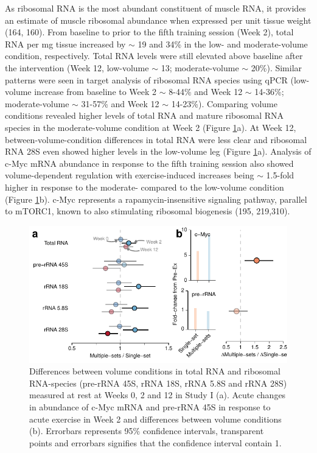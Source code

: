 \documentclass[twoside,10pt]{gihclass} %
\begin{document}
As ribosomal RNA is the most abundant constituent of muscle RNA, it provides an estimate of muscle ribosomal abundance when expressed per unit tissue weight
(164, 160).
From baseline to prior to the fifth training session (Week 2), total RNA per mg tissue increased by \(\sim\) 19 and 34\% in the low- and moderate-volume condition, respectively. Total RNA levels were still elevated above baseline after the intervention (Week 12, low-volume \(\sim\) 13; moderate-volume \(\sim\) 20\%). Similar patterns were seen in target analysis of ribosomal RNA species using qPCR (low-volume increase from baseline to Week 2 \(\sim\) 8-44\% and Week 12 \(\sim\) 14-36\%; moderate-volume \(\sim\) 31-57\% and Week 12 \(\sim\) 14-23\%). Comparing volume conditions revealed higher levels of total RNA and mature ribosomal RNA species in the moderate-volume condition at Week 2 (Figure \ref{fig:rrna-fig}a). At Week 12, between-volume-condition differences in total RNA were less clear and ribosomal RNA 28S even showed higher levels in the low-volume leg (Figure \ref{fig:rrna-fig}a).
Analysis of c-Myc mRNA abundance in response to the fifth training session also showed volume-dependent regulation with exercise-induced increases being \(\sim\) 1.5-fold higher in response to the moderate- compared to the low-volume condition (Figure \ref{fig:rrna-fig}b). c-Myc represents a rapamycin-insensitive signaling pathway, parallel to mTORC1, known to also stimulating ribosomal biogenesis
(195, 219,310).
\begin{figure}

{\centering \includegraphics{thesis_files/figure-latex/rrna-fig-1} 

}

\caption[Differences between volume conditions total RNA and ribosomal RNA]{Differences between volume conditions in total RNA and ribosomal RNA-species (pre-rRNA 45S, rRNA 18S, rRNA 5.8S and rRNA 28S) measured at rest at Weeks 0, 2 and 12 in Study I (a). Acute changes in abundance of c-Myc mRNA and pre-rRNA 45S in response to acute exercise in Week 2 and differences between volume conditions (b). Errorbars represents 95\% confidence intervals, transparent points and errorbars signifies that the confidence interval contain 1.}\label{fig:rrna-fig}
\end{figure}
\end{document}
